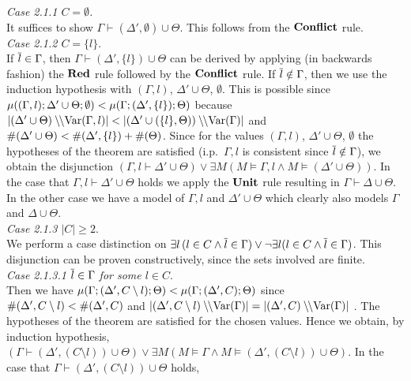 \begin{mytheorem}
{%
\noindent\emph{Case 2.1.1  $C = \emptyset$.}\\
% 
It suffices to show $\Gamma \vdash (\Delta' , \emptyset) \cup \Theta$. 
This follows from the $\Conflict$ rule.\\[1em]
%
\noindent\emph{Case 2.1.2 $C = \{ l \}$}.\\
%
If $\mybar{l}\in\Gamma$, then $\Gamma \vdash (\Delta' , \{ l \}) \cup \Theta$
can be derived by applying (in backwards fashion) the $\Red$ rule followed
by the $\Conflict$ rule.
% 
If $\mybar{l}\notin\Gamma$, then we use the induction
hypothesis with $(\Gamma,l) $, $\Delta' \cup \Theta$, $\emptyset$.
This is possible since $\muu{(\Gamma,l)}{\Delta' \cup \Theta}{\emptyset}
<\muu{\Gamma}{(\Delta',\{l\})}{\Theta}$ because 
$ \measure{\Gamma,l}{(\Delta'\cup \Theta)} < \measure{\Gamma}{(\Delta'\cup(\{l\},\Theta))}
$ and 
$\weight{\Delta'\cup\Theta} < \weight{\Delta',\{l\}}+\weight{\Theta}$.
Since for the values $(\Gamma,l) $, $\Delta' \cup \Theta$, $\emptyset$
the hypotheses of the theorem are satisfied (i.p.\ $\Gamma,l$ is consistent since
$\mybar{l}\notin\Gamma$), we obtain the disjunction 
%
$(\Gamma, l \vdash \Delta' \cup
\Theta) \vee \exists M(M \models \Gamma, l \wedge M \models
(\Delta' \cup \Theta))$. 
%
In the case that $\Gamma,l \vdash \Delta'
\cup \Theta$ holds we apply the $\Unit$ rule resulting in $\Gamma
\vdash \Delta \cup \Theta$. 
%
In the other case we have a model of  $\Gamma, l$ and $\Delta' \cup \Theta$
which clearly also models $\Gamma$ and $\Delta \cup \Theta$.\\[1em]
%
\noindent
%
\emph{Case 2.1.3 $|C| \geq 2$}.\\
% 
We perform a case distinction on $\exists
l \,(l \in C \wedge \mybar{l} \in \Gamma) \lor \neg \exists l (l \in C
\wedge \mybar{l} \in \Gamma)$. This disjunction can be proven constructively, 
since the sets involved are finite.\\[.5em]
%
\noindent
%
\emph{Case 2.1.3.1 $\mybar{l} \in \Gamma$ for some $l\in C$}.\\
Then we have $\muu{\Gamma}{(\Delta',C\setminus l)}{\Theta}
<\muu{\Gamma}{(\Delta',C)}{\Theta}$ since 
$\weight{\Delta',C\setminus l}<\weight{\Delta',C}$ and $\measure{\Gamma}{(\Delta',C\setminus l)} = \measure{\Gamma}{(\Delta',C)}$ .
The hypotheses of the theorem are satisfied for the chosen values.
Hence we obtain, by induction hypothesis,
%
$(\Gamma \vdash (\Delta', (C \setminus l)) \cup \Theta)\lor 
\exists M(M\models\Gamma \land M\models(\Delta',(C\setminus l))\cup\Theta)$. 
%
In the case that $\Gamma \vdash (\Delta',(C \setminus l)) \cup \Theta$ holds, 
}
\end{mytheorem}
